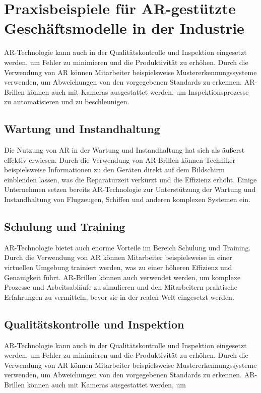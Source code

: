 \section{Praxisbeispiele für AR-gestützte Geschäftsmodelle in der Industrie
 }

AR-Technologie kann auch in der Qualitätskontrolle und Inspektion eingesetzt
werden, um Fehler zu minimieren und die Produktivität zu erhöhen. Durch die
Verwendung von AR können Mitarbeiter beispielsweise Mustererkennungssysteme
verwenden, um Abweichungen von den vorgegebenen Standards zu erkennen.
AR-Brillen können auch mit Kameras ausgestattet werden, um Inspektionsprozesse
zu automatisieren und zu beschleunigen.

\subsection{Wartung und Instandhaltung}
Die Nutzung von AR in der Wartung und Instandhaltung hat sich als äußerst
effektiv erwiesen. Durch die Verwendung von AR-Brillen können Techniker
beispielsweise Informationen zu den Geräten direkt auf dem Bildschirm
einblenden lassen, was die Reparaturzeit verkürzt und die Effizienz erhöht.
Einige Unternehmen setzen bereits AR-Technologie zur Unterstützung der Wartung
und Instandhaltung von Flugzeugen, Schiffen und anderen komplexen Systemen ein.

\subsection{Schulung und Training}
AR-Technologie bietet auch enorme Vorteile im Bereich Schulung und Training.
Durch die Verwendung von AR können Mitarbeiter beispielsweise in einer
virtuellen Umgebung trainiert werden, was zu einer höheren Effizienz und
Genauigkeit führt. AR-Brillen können auch verwendet werden, um komplexe
Prozesse und Arbeitsabläufe zu simulieren und den Mitarbeitern praktische
Erfahrungen zu vermitteln, bevor sie in der realen Welt eingesetzt werden.

\subsection{Qualitätskontrolle und Inspektion}
AR-Technologie kann auch in der Qualitätskontrolle und Inspektion eingesetzt
werden, um Fehler zu minimieren und die Produktivität zu erhöhen. Durch die
Verwendung von AR können Mitarbeiter beispielsweise Mustererkennungssysteme
verwenden, um Abweichungen von den vorgegebenen Standards zu erkennen.
AR-Brillen können auch mit Kameras ausgestattet werden, um